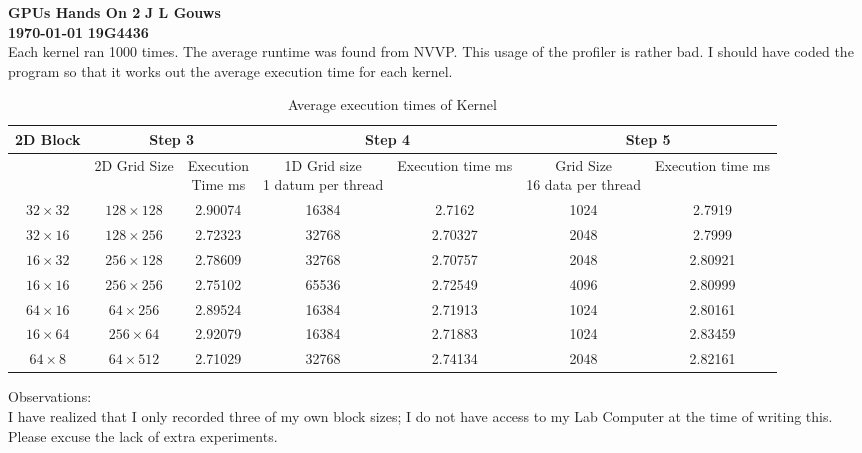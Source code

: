 \documentclass[a4paper,12pt]{article}
\newcommand\block[1]{\hspace*{#1}}
\begin{document}
\selectfont
\thispagestyle{empty}

{\Large \textbf{GPUs Hands On 2}} \hfill {\Large \textbf{J L Gouws}}\\
\block{1.0cm} {\large \textbf{\today}} \hfill {\large \textbf{19G4436}}\\

Each kernel ran 1000 times. 
The average runtime was found from NVVP.
This usage of the profiler is rather bad.
I should have coded the program so that it works out the average execution time for each kernel.
\begin{table}[!h]
  \centering
  \begin{tabular}{|c|c|c|c|c|c|c|}
    \hline
    \textbf{2D Block} & \multicolumn{2}{c|}{\textbf{Step 3}} & \multicolumn{2}{c|}{\textbf{Step 4}} & \multicolumn{2}{c|}{\textbf{Step 5}}  \\ \hline
             & 2D Grid Size& \multicolumn{1}{p{5em}|}{Execution \newline Time ms} & \multicolumn{1}{p{5.5em}|}{1D Grid size\newline 1 datum per thread} & \multicolumn{1}{p{5.5em}|}{Execution time ms}&\multicolumn{1}{p{5em}|}{Grid Size\newline 16 data per thread} & \multicolumn{1}{p{5em}|}{Execution time ms} \\ \hline
    $32 \times 32$ & $128 \times 128$ & 2.90074 & 16384 & 2.7162 & 1024 & 2.7919 \\ \hline
    $32 \times 16$ & $128 \times 256$ & 2.72323 & 32768 & 2.70327 & 2048 & 2.7999 \\ \hline
    $16 \times 32$ & $256 \times 128$ & 2.78609 & 32768 & 2.70757 & 2048 & 2.80921 \\ \hline
    $16 \times 16$ & $256 \times 256$ & 2.75102 & 65536 & 2.72549 & 4096 & 2.80999 \\ \hline
    $64 \times 16$ & $64  \times 256$ & 2.89524 & 16384 & 2.71913 & 1024 & 2.80161 \\ \hline
    $16 \times 64$ & $256 \times 64 $ & 2.92079 & 16384 & 2.71883 & 1024 & 2.83459 \\ \hline
    $64 \times  8$ & $64  \times 512$ & 2.71029 & 32768 & 2.74134 & 2048 & 2.82161 \\ \hline
  \end{tabular}
  \caption{Average execution times of Kernel}
  \label{table2}
\end{table}
Observations:\\
I have realized that I only recorded three of my own block sizes; I do not have access to my Lab Computer at the time of writing this.
Please excuse the lack of extra experiments.
\end{document}

